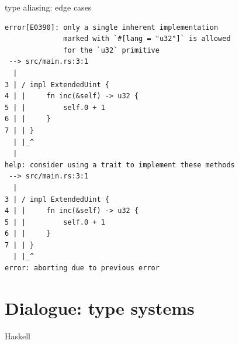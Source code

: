 \documentclass{beamer}
\begin{document}
\begin{frame}[fragile]{type aliasing: edge cases}
  \begin{verbatim}
error[E0390]: only a single inherent implementation
              marked with `#[lang = "u32"]` is allowed
              for the `u32` primitive
 --> src/main.rs:3:1
  |
3 | / impl ExtendedUint {
4 | |     fn inc(&self) -> u32 {
5 | |         self.0 + 1
6 | |     }
7 | | }
  | |_^
  |
help: consider using a trait to implement these methods
 --> src/main.rs:3:1
  |
3 | / impl ExtendedUint {
4 | |     fn inc(&self) -> u32 {
5 | |         self.0 + 1
6 | |     }
7 | | }
  | |_^
error: aborting due to previous error
  \end{verbatim}
\end{frame}

\section{Dialogue: type systems}


\begin{frame}[standout]
  Haskell
\end{frame}
\end{document}
